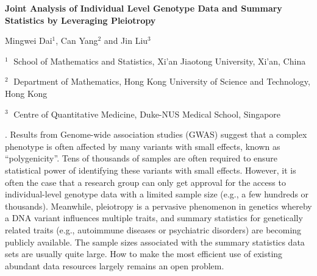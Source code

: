 \documentclass[12pt]{article}
\begin{document}
\begin{flushleft}


{\LARGE\bf Joint Analysis of Individual Level Genotype Data and Summary Statistics by Leveraging Pleiotropy}


\vspace{1.0cm}

Mingwei Dai$^1$, Can Yang$^2$ and Jin Liu$^3$

\begin{description}

\item $^1 \;$ School of Mathematics and Statistics, Xi'an Jiaotong University, Xi'an, China

\item $^2 \;$ Department of Mathematics, Hong Kong University of Science and Technology, Hong Kong

\item $^3 \;$ Centre of Quantitative Medicine, Duke-NUS Medical School, Singapore

\end{description}

\end{flushleft}


\vspace{0.75cm}

. 
Results from Genome-wide association studies (GWAS) suggest that a complex phenotype is often affected by many variants with small effects, known as ``polygenicity''. Tens of thousands of samples are often required to ensure statistical power of identifying these variants with small effects. However, it is often the case that a research group can only get approval for the access to individual-level genotype data with a limited sample size (e.g., a few hundreds or thousands). Meanwhile, pleiotropy is a pervasive phenomenon in genetics whereby a DNA variant influences multiple traits, and summary statistics for genetically related traits (e.g., autoimmune diseases or  psychiatric disorders)  are becoming publicly available. The sample sizes associated with the summary statistics data sets are usually quite large. How to make the most efficient use of existing abundant data resources largely remains an open problem.
\end{document}
